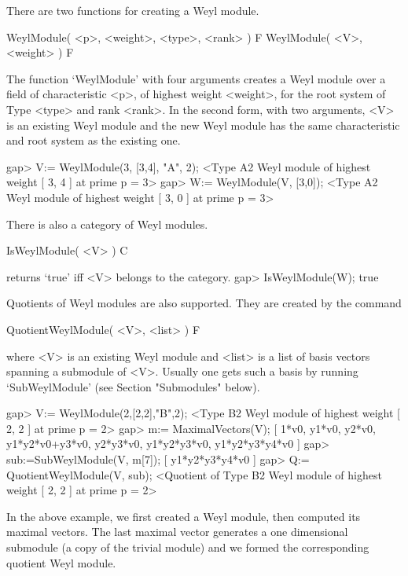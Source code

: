 
There are two functions for creating a Weyl module. 

\>WeylModule( <p>, <weight>, <type>, <rank> ) F
\>WeylModule( <V>, <weight> ) F

The function `WeylModule' with four arguments creates a Weyl module
over a field of characteristic <p>, of highest weight <weight>, for
the root system of Type <type> and rank <rank>. In the second form,
with two arguments, <V> is an existing Weyl module and the new Weyl
module has the same characteristic and root system as the existing
one.

\beginexample
gap> V:= WeylModule(3, [3,4], "A", 2);
<Type A2 Weyl module of highest weight [ 3, 4 ] at prime p = 3>
gap> W:= WeylModule(V, [3,0]);
<Type A2 Weyl module of highest weight [ 3, 0 ] at prime p = 3>
\endexample

There is also a category of Weyl modules. 

\>IsWeylModule( <V> ) C

returns `true' iff <V> belongs to the category.
\beginexample
gap> IsWeylModule(W);
true
\endexample



Quotients of Weyl modules are also supported. They are created by
the command

\>QuotientWeylModule( <V>, <list> )  F

where <V> is an existing Weyl module and <list> is a list of basis
vectors spanning a submodule of <V>. Usually one gets such a basis by
running `SubWeylModule' (see Section "Submodules" below).

\beginexample
gap> V:= WeylModule(2,[2,2],"B",2);
<Type B2 Weyl module of highest weight [ 2, 2 ] at prime p = 2>
gap> m:= MaximalVectors(V);
[ 1*v0, y1*v0, y2*v0, y1*y2*v0+y3*v0, y2*y3*v0, y1*y2*y3*v0, y1*y2*y3*y4*v0 ]
gap> sub:=SubWeylModule(V, m[7]);
[ y1*y2*y3*y4*v0 ]
gap> Q:= QuotientWeylModule(V, sub);
<Quotient of Type B2 Weyl module of highest weight [ 2, 2 ] at prime p = 2>
\endexample

In the above example, we first created a Weyl module, then computed
its maximal vectors. The last maximal vector generates a one
dimensional submodule (a copy of the trivial module) and we formed the
corresponding quotient Weyl module. 

